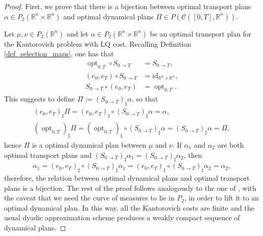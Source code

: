 \documentclass[reqno]{amsart}
\DeclareMathOperator{\opt}{opt}
\theoremstyle{plain}
\theoremstyle{definition}
\theoremstyle{remark}
\begin{document}
        \begin{proof}
            First, we prove that there is a bijection between optimal transport plans $\alpha\in P_2(\mathbb{R}^n\times\mathbb{R}^n)$ and optimal dynamical plans $\Pi\in P(\mathcal{C}([0,T],\mathbb{R}^n))$.
		
		
			Let $\mu, \nu\in P_2(\mathbb{R}^n)$ and let $\alpha\in P_2(\mathbb{R}^n\times\mathbb{R}^n)$ be an optimal transport plan for the Kantorovich problem with LQ cost. 
			Recalling Definition \ref{def_selection_maps}, one has that
			\begin{align}
				\opt_{0,T}\circ S_{0\to T}&=S_{0\to T},\\
				(e_0,e_T)\circ  S_{0\to T}&=\mathrm{id}_{\mathbb{R}^n\times\mathbb{R}^n},\\
				S_{0\to T}\circ(e_0,e_T)&=\opt_{0,T}.
			\end{align}
			This suggests to define $\Pi:=(S_{0\to T})_{\sharp}\alpha$, so that
			\begin{gather}
				(e_0,e_T)_{\sharp}\Pi=(e_0,e_T)_{\sharp}\circ(S_{0\to T})_{\sharp}\alpha=\alpha,\\
				(\opt_{0,T})_{\sharp}\Pi=(\opt_{0,T})_{\sharp}\circ(S_{0\to T})_{\sharp}\alpha=(S_{0\to T})_{\sharp}\alpha=\Pi,
			\end{gather}
			hence $\Pi$ is a optimal dynamical plan between $\mu$ and $\nu$.
			If $\alpha_1$ and $\alpha_2$ are both optimal transport plans and $(S_{0\to T})_{\sharp}\alpha_1=(S_{0\to T})_{\sharp}\alpha_2$, then 
			\begin{equation}
				\alpha_1=(e_0,e_T)_{\sharp}\circ(S_{0\to T})_{\sharp}\alpha_1=(e_0,e_T)_{\sharp}\circ(S_{0\to T})_{\sharp}\alpha_2=\alpha_2,
			\end{equation}
			therefore, the relation between optimal dynamical plans and optimal transport plans is a bijection. 
            The rest of the proof follows analogously to the one of \cite[Theorem 7.21]{Villanioldandnew}, with the caveat that we need the curve of measures to lie in $P_2$, in order to lift it to an optimal dynamical plan. In this way, all the Kantorovich costs are finite and the usual dyadic approximation scheme produces a weakly compact sequence of dynamical plans.  
        \end{proof}
        
\end{document}
